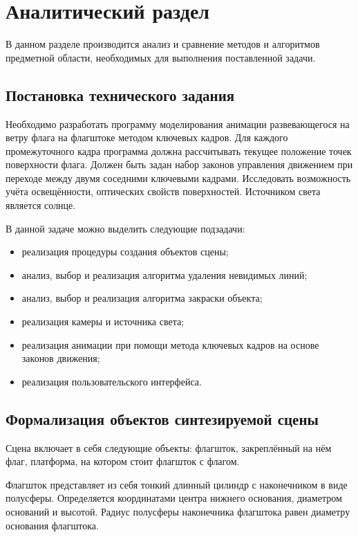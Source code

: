 \chapter{Аналитический раздел}
\vspace{-0.5cm}\hspace{0.6cm}В данном разделе производится анализ и сравнение методов и алгоритмов предметной области, необходимых для выполнения поставленной задачи.

\section{Постановка технического задания}
\hspace{0.6cm}Необходимо разработать программу моделирования анимации развевающегося на ветру флага на флагштоке методом ключевых кадров. Для каждого промежуточного кадра программа должна рассчитывать текущее положение точек поверхности флага. Должен быть задан набор законов управления движением при переходе между двумя соседними ключевыми кадрами. Исследовать возможность учёта освещённости, оптических свойств поверхностей. Источником света является солнце.

\vspace{0.3cm}В данной задаче можно выделить следующие подзадачи:

\begin{itemize}
	\item реализация процедуры создания объектов сцены;
	\item анализ, выбор и реализация алгоритма удаления невидимых линий;
	\item анализ, выбор и реализация алгоритма закраски объекта;
	\item реализация камеры и источника света;
	\item реализация анимации при помощи метода ключевых кадров на основе законов движения;
	\item реализация пользовательского интерфейса.
\end{itemize}

\section{Формализация объектов синтезируемой сцены}
\hspace{0.6cm}Сцена включает в себя следующие объекты: флагшток, закреплённый на нём флаг, платформа, на котором стоит флагшток с флагом.

\vspace{0.3cm}Флагшток представляет из себя тонкий длинный цилиндр с наконечником в виде полусферы. Определяется координатами центра нижнего основания, диаметром оснований и высотой. Радиус полусферы наконечника флагштока равен диаметру основания флагштока.

